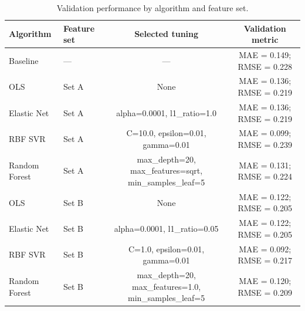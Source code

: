 \begin{table}[H]
\centering\small
\begin{tabular}{llcc}
\toprule
Algorithm & Feature set & Selected tuning & Validation metric \\
\midrule
Baseline & --- & --- & MAE = 0.149; RMSE = 0.228 \\
OLS & Set A & None & MAE = 0.136; RMSE = 0.219 \\
Elastic Net & Set A & alpha=0.0001, l1\_ratio=1.0 & MAE = 0.136; RMSE = 0.219 \\
RBF SVR & Set A & C=10.0, epsilon=0.01, gamma=0.01 & MAE = 0.099; RMSE = 0.239 \\
Random Forest & Set A & max\_depth=20, max\_features=sqrt, min\_samples\_leaf=5 & MAE = 0.131; RMSE = 0.224 \\
OLS & Set B & None & MAE = 0.122; RMSE = 0.205 \\
Elastic Net & Set B & alpha=0.0001, l1\_ratio=0.05 & MAE = 0.122; RMSE = 0.205 \\
RBF SVR & Set B & C=1.0, epsilon=0.01, gamma=0.01 & MAE = 0.092; RMSE = 0.217 \\
Random Forest & Set B & max\_depth=20, max\_features=1.0, min\_samples\_leaf=5 & MAE = 0.120; RMSE = 0.209 \\
\bottomrule
\end{tabular}
\caption{Validation performance by algorithm and feature set.}
\end{table}
